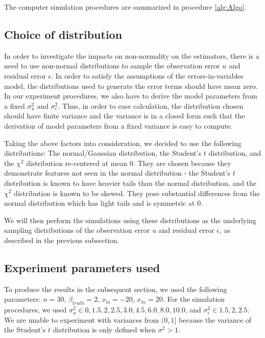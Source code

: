 \documentclass{article}
\begin{document}
The computer simulation procedures are summarized in procedure \ref{alg:Algo}. 

\subsection{Choice of distribution}

In order to investigate the impacts on non-normality on the estimators, there is a need to use non-normal distributions to sample the observation error $u$ and residual error $\epsilon$.
In order to satisfy the assumptions of the errors-in-variables model, the distributions used to generate the error terms should have mean zero.
In our experiment procedures, we also have to derive the model parameters from a fixed $\sigma_u^2$ and $\sigma_\epsilon^2$.
Thus, in order to ease calculation, the distribution chosen should have finite variance and the variance is in a closed form such that the derivation of model parameters from a fixed variance is easy to compute.

Taking the above factors into consideration, we decided to use the following distributions: The normal/Gaussian distribution, the Student's $t$ distribution, and the $\chi^2$ distribution re-centered at mean $0$.
They are chosen because they demonstrate features not seen in the normal distribution - the Student's $t$ distribution is known to have heavier tails than the normal distribution, and the $\chi^2$ distribution is known to be skewed.
They pose substantial differences from the normal distribution which has light tails and is symmetric at $0$.

We will then perform the simulations using these distributions as the underlying sampling distributions of the observation error $u$ and residual error $\epsilon$, as described in the previous subsection.

\subsection{Experiment parameters used}

To produce the results in the subsequent section, we used the following parameters: $n=30$, $\beta_{truth}=2$, $x_{lo} = -20$, $x_{hi} = 20$.
For the simulation procedures, we used $\sigma^2_u \in {0, 1.5, 2, 2.5, 3.0, 4.5, 6.0, 8.0, 10.0}$, and $\sigma_\epsilon^2 \in {1.5, 2, 2.5}$.
We are unable to experiment with variances from $(0, 1]$ because the variance of the Student's $t$ distribution is only defined when $\sigma^2 > 1$.
\end{document}
